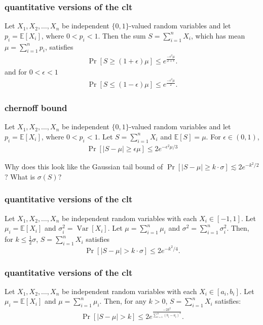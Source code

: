 \documentclass[compress]{beamer}
\newcommand{\E}{\mathbb{E}}
\DeclareMathOperator{\Var}{Var}
\begin{document}
\begin{frame}
	\frametitle{quantitative versions of the clt}
	\begin{theorem}
		Let $X_1,X_2,\ldots,X_n$ be independent $\{0,1\}$-valued random variables and let
		$p_i = \E[X_i]$, where $0<p_i<1$.
		Then the sum $S = \sum_{i=1}^{n} X_i$, which has mean
		$\mu = \sum_{i=1}^{n} p_i$, satisfies
		\begin{align*}
			\Pr[S \geq (1+\epsilon)\mu] \leq e^{\frac{-\epsilon^2\mu}{2+ \epsilon}}.
		\end{align*}
		and for $0<\epsilon <1$
		\begin{align*}
			\Pr[S \leq (1-\epsilon)\mu] \leq e^{\frac{-\epsilon^2\mu}{2}}.
		\end{align*}
	\end{theorem} 
\end{frame}

\begin{frame}[t]
	\frametitle{chernoff bound}
	\begin{theorem}
		Let $X_1,X_2,\ldots,X_n$ be independent $\{0,1\}$-valued random variables and let
		$p_i = \E[X_i]$, where $0<p_i<1$.
		Let $S = \sum_{i=1}^{n} X_i$ and $\E[S] = \mu$. For $\epsilon \in (0,1)$,
		\begin{align*}
				\Pr[|S - \mu| \geq \epsilon \mu] \leq 2e^{-\epsilon^2 \mu/3}
		\end{align*}
	\end{theorem} 
Why does this look like the Gaussian tail bound of 	$\Pr[|S - \mu| \geq k\cdot\sigma] \lesssim 2e^{-k^2/2}$? What is $\sigma(S)$?
\end{frame}



\begin{frame}[t]
	\frametitle{quantitative versions of the clt}
	\begin{theorem}
		Let $X_1, X_2, \ldots, X_n$ be independent random variables with each $X_i \in [-1,1]$.
		Let $\mu_i =\E[X_i]$ and $\sigma_i^2 = \Var[X_i]$. Let  $\mu =\sum_{i=1}^n \mu_i$ and $\sigma^2 =\sum_{i=1}^n \sigma_i^2$. Then, for $k \leq \frac{1}{2}\sigma$, $S =\sum_{i=1}^n X_i$ satisfies
		$$\Pr[|S - \mu| > k\cdot \sigma] \leq  2 e^{-{k^2}/{4}}.$$
	\end{theorem}
\end{frame}

\begin{frame}[t]
	\frametitle{quantitative versions of the clt}
	\begin{theorem}
		Let $X_1, X_2, \ldots, X_n$ be independent random variables with each $X_i \in [a_i,b_i]$.
		Let $\mu_i =\E[X_i]$ and $\mu =\sum_{i=1}^n \mu_i$. Then, for any $k > 0$, $S =\sum_{i=1}^n X_i$ satisfies:
		$$\Pr[|S - \mu| > k] \leq  2 e^{\frac{-2k^2}{\sum_{i=1}^n (b_i-a_i)^2}}.$$
	\end{theorem}
\end{frame}
\end{document}
